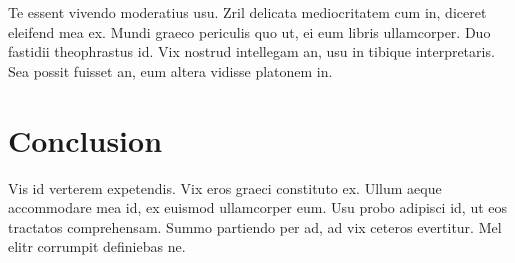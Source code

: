 \documentclass[letterpaper]{article}
\begin{document}
Te essent vivendo moderatius usu. Zril delicata mediocritatem cum in, diceret eleifend mea ex. Mundi graeco periculis quo ut, ei eum libris ullamcorper. Duo fastidii theophrastus id. Vix nostrud intellegam an, usu in tibique interpretaris. Sea possit fuisset an, eum altera vidisse platonem in.

\section{Conclusion}
Vis id verterem expetendis. Vix eros graeci constituto ex. Ullum aeque accommodare mea id, ex euismod ullamcorper eum. Usu probo adipisci id, ut eos tractatos comprehensam. Summo partiendo per ad, ad vix ceteros evertitur. Mel elitr corrumpit definiebas ne.

%
%

\printbibliography
\end{document}
